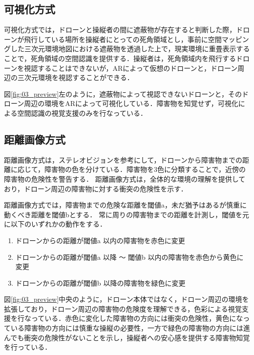 \documentclass[submit]{ipsj}
\begin{document}
\subsection{可視化方式}
可視化方式では，ドローンと操縦者の間に遮蔽物が存在すると判断した際，ドローンが飛行している場所を操縦者にとっての死角領域とし，事前に空間マッピングした三次元環境地図における遮蔽物を透過した上で，現実環境に重畳表示することで，死角領域の空間認識を提供する．操縦者は，死角領域内を飛行するドローンを視認することはできないが，ARによって仮想のドローンと，ドローン周辺の三次元環境を視認することができる．
\par
図\ref{fig:03_preview}左のように，遮蔽物によって視認できないドローンと，そのドローン周辺の環境をARによって可視化している．障害物を知覚せず，可視化による空間認識の視覚支援のみを行なっている．


\subsection{距離画像方式}
距離画像方式は，ステレオビジョンを参考にして，ドローンから障害物までの距離に応じて，障害物の色を分けている．障害物を3色に分類することで，近傍の障害物の危険性を警告する．
距離画像方式は，全体的な環境の理解を提供しており，ドローン周辺の障害物に対する衝突の危険性を示す．
\par
距離画像方式では，障害物までの危険な距離を閾値a，未だ猶予はあるが慎重に動くべき距離を閾値bとする．
常に周りの障害物までの距離を計測し，閾値を元に以下のいずれかの動作をする．

\begin{enumerate}
	\item ドローンからの距離が閾値a 以内の障害物を赤色に変更
    
    \item ドローンからの距離が閾値a 以降 〜 閾値b 以内の障害物を赤色から黄色に変更
    
    \item ドローンからの距離が閾値b 以降の障害物を緑色に変更
\end{enumerate}

図\ref{fig:03_preview}中央のように，ドローン本体ではなく，ドローン周辺の環境を拡張しており，ドローン周辺の障害物の危険度を理解できる，色彩による視覚支援を行なっている．赤色に変化した障害物の方向には衝突の危険性，黄色になっている障害物の方向には慎重な操縦の必要性，一方で緑色の障害物の方向には進んでも衝突の危険性がないことを示し，操縦者への安心感を提供する障害物知覚を行っている．
\end{document}
